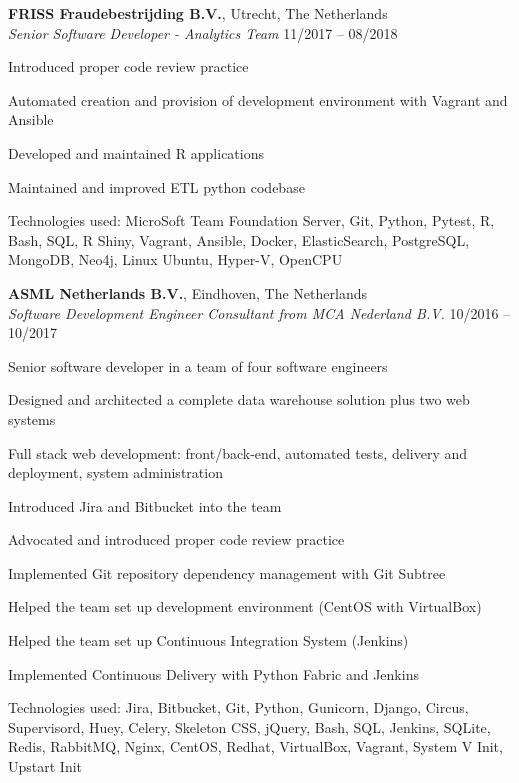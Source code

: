 \documentclass[margin,line]{resume}
\begin{document}
\begin{resume}
    \textbf{FRISS Fraudebestrijding B.V.}, Utrecht, The Netherlands \\
    \textsl{Senior Software Developer - Analytics Team} \hfill 11/2017 -- 08/2018 \vspace{-3mm}\\\vspace{-1mm}%
      \begin{list2}
      \item Introduced proper code review practice
      \item Automated creation and provision of development environment with Vagrant and Ansible
      \item Developed and maintained R applications
      \item Maintained and improved ETL python codebase
      \item Technologies used: MicroSoft Team Foundation Server, Git, Python, Pytest, R, Bash, SQL, R Shiny, Vagrant, Ansible, Docker,
            ElasticSearch, PostgreSQL, MongoDB, Neo4j, Linux Ubuntu, Hyper-V, OpenCPU
      \end{list2}

    \textbf{ASML Netherlands B.V.}, Eindhoven, The Netherlands \\
    \textsl{Software Development Engineer Consultant from MCA Nederland B.V.} \hfill 10/2016 -- 10/2017 \vspace{-3mm}\\\vspace{-1mm}%
      \begin{list2}
      \item Senior software developer in a team of four software engineers
      \item Designed and architected a complete data warehouse solution plus two web systems
      \item Full stack web development: front/back-end, automated tests, delivery and deployment, \newline system administration
      \item Introduced Jira and Bitbucket into the team
      \item Advocated and introduced proper code review practice
      \item Implemented Git repository dependency management with Git Subtree
      \item Helped the team set up development environment (CentOS with VirtualBox)
      \item Helped the team set up Continuous Integration System (Jenkins)
      \item Implemented Continuous Delivery with Python Fabric and Jenkins
      \item Technologies used: Jira, Bitbucket, Git, Python, Gunicorn, Django, Circus, Supervisord, Huey, Celery, Skeleton CSS, jQuery,
            Bash, SQL, Jenkins, SQLite, Redis, RabbitMQ, Nginx, CentOS, Redhat, VirtualBox, Vagrant, System V Init, Upstart Init
      \end{list2}


\end{resume}
\end{document}
